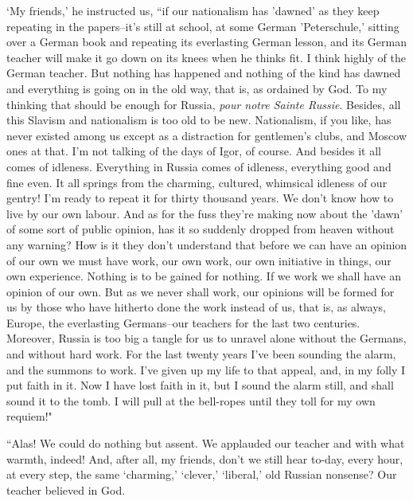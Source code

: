\documentclass[12pt]{article}
\begin{document}
\vspace{12pt}
`My friends,' he instructed us, ``if our nationalism has 'dawned' as
they keep repeating in the papers--it's still at school, at some German
'Peterschule,' sitting over a German book and repeating its everlasting
German lesson, and its German teacher will make it go down on its knees
when he thinks fit. I think highly of the German teacher. But nothing
has happened and nothing of the kind has dawned and everything is going
on in the old way, that is, as ordained by God. To my thinking that
should be enough for Russia, \emph{pour notre Sainte Russie}. Besides, all this
Slavism and nationalism is too old to be new. Nationalism, if you like,
has never existed among us except as a distraction for gentlemen's
clubs, and Moscow ones at that. I'm not talking of the days of Igor, of
course. And besides it all comes of idleness. Everything in Russia comes
of idleness, everything good and fine even. It all springs from the
charming, cultured, whimsical idleness of our gentry! I'm ready to
repeat it for thirty thousand years. We don't know how to live by our
own labour. And as for the fuss they're making now about the 'dawn'
of some sort of public opinion, has it so suddenly dropped from heaven
without any warning? How is it they don't understand that before we
can have an opinion of our own we must have work, our own work, our own
initiative in things, our own experience. Nothing is to be gained for
nothing. If we work we shall have an opinion of our own. But as we
never shall work, our opinions will be formed for us by those who have
hitherto done the work instead of us, that is, as always, Europe, the
everlasting Germans--our teachers for the last two centuries. Moreover,
Russia is too big a tangle for us to unravel alone without the Germans,
and without hard work. For the last twenty years I've been sounding the
alarm, and the summons to work. I've given up my life to that appeal,
and, in my folly I put faith in it. Now I have lost faith in it, but I
sound the alarm still, and shall sound it to the tomb. I will pull at
the bell-ropes until they toll for my own requiem!"


\vspace{12pt}
``Alas! We could do nothing but assent. We applauded our teacher and with
what warmth, indeed! And, after all, my friends, don't we still hear
to-day, every hour, at every step, the same `charming,' `clever,'
`liberal,' old Russian nonsense? Our teacher believed in God.
\end{document}
